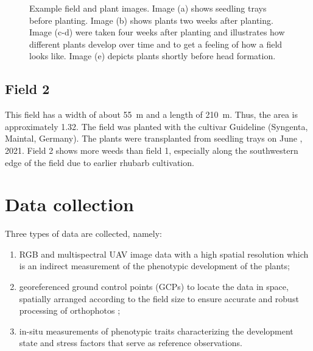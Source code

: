 \documentclass{article}
\begin{document}
\begin{figure}[h]
	\centering
	\caption{Example field and plant images. Image (a) shows seedling trays before planting. Image (b) shows plants two weeks after planting. Image (c-d) were taken four weeks after planting and illustrates how different plants develop over time and to get a feeling of how a field looks like. Image (e) depicts plants shortly before head formation.}
	\label{fig:field_images}
\end{figure}

\subsection{Field 2}
This field has a width of about \SI{55}{\meter} and a length of \SI{210}{\meter}. Thus, the area is approximately \SI{1.32}{\ha}. The field was planted with the cultivar Guideline (Syngenta, Maintal, Germany). The plants were transplanted from seedling trays on June , 2021. Field 2 shows more weeds than field 1, especially along the southwestern edge of the field due to earlier rhubarb cultivation.

\section{Data collection}\label{sec:dataCollection}
Three types of data are collected, namely:
\begin{enumerate}
    \item RGB and multispectral UAV image data with a high spatial resolution which is an indirect measurement of the phenotypic development of the plants;
    \item georeferenced ground control points (GCPs) to locate the data in space, spatially arranged according to the field size to ensure accurate and robust processing of orthophotos \citep{persia2020archival};
    \item in-situ measurements of phenotypic traits characterizing the development state and stress factors that serve as reference observations.
\end{enumerate}
\end{document}
